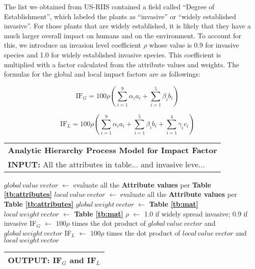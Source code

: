 \documentclass[12pt]{article}
\newcommand{\toB}[1]{\color{blue}#1\color{black}}
\begin{document}
		The list we obtained from US-RIIS contained a field called ``Degree of Establishment'', which labeled the plants as ``invasive'' or ``widely established invasive''.  For those plants that are widely established, it is likely that they have a much larger overall impact on humans and on the environment.  To account for this, we introduce an invasion level coefficient $\rho$ whose value is 0.9 for invasive species and 1.0 for widely established invasive species.  This coefficient is multiplied with a factor calculated from the attribute values and weights.  The formulas for the global and local impact factors are as followings:
		
		\begin{equation}
			\mathrm{IF}_G = 100\rho \left( \sum_{i = 1}^9 \alpha_ia_i + \sum_{i = 1}^5 \beta_ib_i \right)
		\end{equation}
		
		\begin{equation}
			\mathrm{IF}_L = 100\rho \left( \sum_{i = 1}^9 \alpha_ia_i + \sum_{i = 1}^5 \beta_ib_i + \sum_{i = 1}^4 \gamma_ic_i \right)
		\end{equation}
		
		{
			\fontsize{10}{14}\selectfont
			{
				\setlength{\parindent}{-1em}
				
				{
					\fontsize{12}{18}\selectfont
					\begin{longtable}{p{6.65in}}
						\toprule
						\textbf{Analytic Hierarchy Process Model for Impact Factor}\\
						\textbf{INPUT:} All the attributes in table... and invasive leve... \\
						\bottomrule
					\end{longtable}
				}
				
				\vspace{-0.5em}
				\begin{algorithmic}
					\State \toB{$global\,value\,vector$ } $\gets$ evaluate all the \textbf{Attribute values} per \textbf{Table \ref{tb:attributes}}
					\State \toB{$local\,value\,vector$ } $\gets$ evaluate all the \textbf{Attribute values} per \textbf{Table \ref{tb:attributes}}
					\State \toB{$global\,weight\,vector$ } $\gets$ \textbf{Table \ref{tb:mat}}
					\State \toB{$local\,weight\,vector$ } $\gets$ \textbf{Table \ref{tb:mat}}
					\State \toB{$\rho$ } $\gets$ 1.0 if widely spread invasive; 0.9 if invasive
					\State \toB{IF$_G$ } $\gets$ \toB{$100\rho$ } times the dot product of \toB{$global\,value\,vector$ } and \toB{$global\,weight\,vector$ }
					\State \toB{IF$_L$ } $\gets$ \toB{$100\rho$ } times the dot product of \toB{$local\,value\,vector$ } and \toB{$local\,weight\,vector$ }
				\end{algorithmic}
				
				{
					\fontsize{12}{18}\selectfont
					\begin{longtable}{p{6.6in}}
						\toprule
						\textbf{OUTPUT:} \toB{IF$_G$ } and \toB{IF$_L$}\\
						\bottomrule
					\end{longtable}
				}
			}
		}	
		
\end{document}
